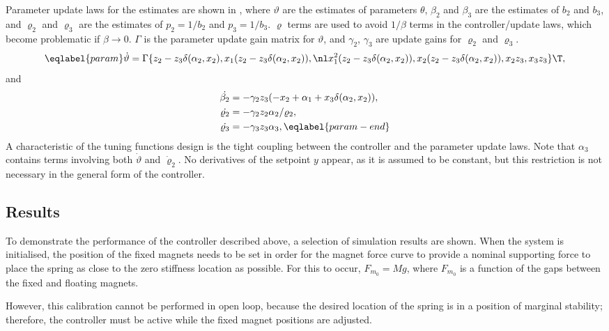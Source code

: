 Parameter update laws for the estimates are shown in
, where $\vartheta$ are the estimates of
parameters $\theta$, $\beta_2$ and $\beta_3$ are the estimates of $b_2$
and $b_3$, and $\varrho_2$ and $\varrho_3$ are the estimates of
$p_2=1/b_2$ and $p_3=1/b_3$. $\varrho$ terms are used to avoid
$1/\beta$ terms in the controller/update laws, which become
problematic if $\beta\to0$. $\Gamma$ is the parameter update gain
matrix for $\vartheta$, and $\gamma_2$, $\gamma_3$ are update gains for $\varrho_2$ and $\varrho_3$.
\begin{multline}\eqlabel{param}
\dot{\vartheta }=\Gamma\left\{z_2-z_3 \delta \left(\alpha _2,x_2\right),x_1 \left(z_2-z_3 \delta \left(\alpha _2,x_2\right)\right),\nl
x_1^2 \left(z_2-z_3 \delta \left(\alpha _2,x_2\right)\right),x_2 \left(z_2-z_3 \delta \left(\alpha _2,x_2\right)\right),x_2 z_3,x_3 z_3\right\}\T ,
\end{multline}
and
\begingroup
\def\frac#1#2{#1/#2}
\begin{align}
  \dot{\beta _2} &=-\gamma _2 z_3 \left(-x_2+\alpha _1+x_3 \delta \left(\alpha _2,x_2\right)\right) ,
  \\
  \dot{\varrho _2}&=-\frac{\gamma _2 z_2 \alpha _2}{\varrho _2} ,
  \\
  \dot{\varrho _3}&=-\gamma _3 z_3 \alpha _3 , \eqlabel{param-end}
\end{align}
\endgroup
\endgroup
A characteristic of the tuning functions design is the tight coupling
between the controller and the parameter update laws. Note that
$\alpha_3$ contains terms involving both $\dot {\vartheta}$ and
$\dot {\varrho} _2$. No derivatives of the setpoint $y$ appear, as it
is assumed to be constant, but this restriction is not necessary in
the general form of the controller.

\subsection{Results}

To demonstrate the performance of the controller described above, a
selection of simulation results are shown. When the system is
initialised, the position of the fixed magnets needs to be set in
order for the magnet force curve to provide a nominal supporting force
to place the spring as close to the zero stiffness location as
possible. For this to occur, $F_{m_0}=Mg$, where $F_{m_0}$ is a
function of the gaps between the fixed and floating magnets.

However, this calibration cannot be performed in open loop, because
the desired location of the spring is in a position of marginal
stability; therefore, the controller must be active while the fixed
magnet positions are adjusted.

